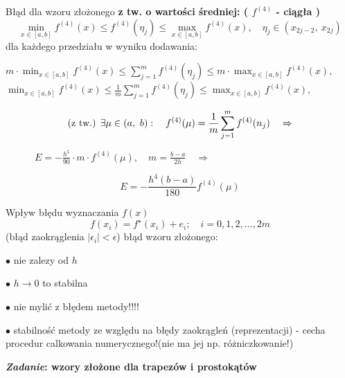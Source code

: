 	\begin{frame}{Błąd dla wzoru złożonego}
      \textbf{z tw. o wartości średniej: ( $f^{(4)}$ - ciągła )}
      $$
      \min_{x\in[a,b]}f^{(4)}(x)\leq f^{(4)}(\eta_{j})\leq \max_{x\in[a,b]}f^{(4)}(x) ,\quad \eta_{j}\in(x_{2j-2},\ x_{2j})
      $$
      \newline
	  dla każdego przedziału w wyniku dodawania:
      \begin{center}
        $\displaystyle
        m\cdot\min_{x\in[a,b]}f^{(4)}(x)\leq\sum_{j=1}^{m}f^{(4)}(\eta_{j})\leq m\cdot \max_{x\in[a,b]}f^{(4)}(x),
        $
        \newline
        $\displaystyle
        \min_{x\in[a,b]}f^{(4)}(x)\leq\frac{1}{m}\sum_{j=1}^{m}f^{(4)}(\eta_{j})\leq \max_{x\in[a,b]}f^{(4)}(x),
        $
      \end{center}
        
    \end{frame}
	\begin{frame}
      $$
      \textnormal{(z tw.) }\exists\mu\in(a,\ b) :\quad f^{(4)}(\mu)=\frac{1}{m}\sum_{j=1}^{m}f^{(4)}(n_{j}) \quad \Rightarrow
      $$

      $\displaystyle
      \qquad\quad E=-\frac{h^{5}}{90} \cdot m\cdot f^{(4)}(\mu) ,\quad m= \frac{b-a}{2h} \quad \Rightarrow
      $
      \begin{exampleblock}{}
      	\[
        	E=-\frac{h^{4}(b-a)}{180}f^{(4)}(\mu)
        \]
      \end{exampleblock}
    \end{frame}
	\begin{frame}{Wpływ błędu wyznaczania $f(x)$}
        $$
        f(x_{i})=f^{\star}(x_{i})+e_{i};\quad i=0, 1, 2, . . ., 2m
        $$
        \newline
        (błąd zaokrąglenia $|\epsilon_{i}|<\epsilon$)
        \newline
		błąd wzoru złożonego:
        
        \quad $\bullet$ nie zalezy od $h$
        
		\quad $\bullet$ $h\rightarrow 0$ to stabilna
        
		\quad $\bullet$ nie mylić z błędem metody!!!!
        
		\quad $\bullet$ stabilność metody ze względu na błędy zaokrągleń (reprezentacji) - cecha procedur calkowania numerycznego!\newline (nie ma jej np. różniczkowanie!)\newline

		\textbf{{\it Zadanie}: wzory złożone dla trapezów i prostokątów}
        
    \end{frame}
